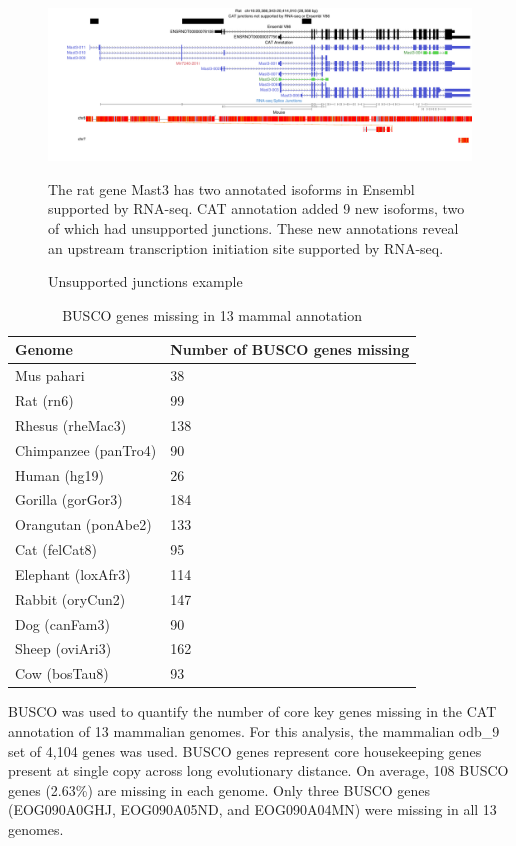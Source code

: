 \documentclass[fleqn,10pt]{wlscirep}
\begin{document}
\begin{figure}
\centering
\includegraphics[width=\textwidth,height=\textheight,keepaspectratio,angle=90]{mast3_example.pdf}
\caption{Unsupported junctions example}
The rat gene Mast3 has two annotated isoforms in Ensembl supported by RNA-seq. CAT annotation added 9 new isoforms, two of which had unsupported junctions. These new annotations reveal an upstream transcription initiation site supported by RNA-seq. 
\label{supp_fig:unsupported_junctions}
\end{figure}

\begin{table}
\centering
\begin{tabular}{|l|l|}
 \hline
Genome & Number of BUSCO genes missing \\ \hline
Mus pahari      & 38 \\ \hline
Rat (rn6)      & 99 \\ \hline
Rhesus (rheMac3)   & 138 \\ \hline
Chimpanzee (panTro4) & 90 \\ \hline
Human (hg19)     & 26 \\ \hline
Gorilla (gorGor3)  & 184 \\ \hline
Orangutan (ponAbe2) & 133 \\ \hline
Cat (felCat8)    & 95 \\ \hline
Elephant (loxAfr3)  & 114 \\ \hline
Rabbit (oryCun2)   & 147 \\ \hline
Dog (canFam3)    & 90 \\ \hline
Sheep (oviAri3)   & 162 \\ \hline
Cow (bosTau8)    & 93 \\ \hline
\end{tabular}
\caption{BUSCO genes missing in 13 mammal annotation}
BUSCO was used to quantify the number of core key genes missing in the CAT annotation of 13 mammalian genomes. For this analysis, the mammalian odb\_9 set of 4,104 genes was used. BUSCO genes represent core housekeeping genes present at single copy across long evolutionary distance. On average, 108 BUSCO genes (2.63\%) are missing in each genome. Only three BUSCO genes (EOG090A0GHJ, EOG090A05ND, and EOG090A04MN) were missing in all 13 genomes.
\label{supp_table:busco}
\end{table}
\end{document}

